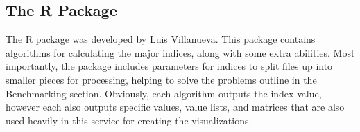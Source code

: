 \subsection{The  R Package}
The  R package was developed by Luis Villanueva. This package contains algorithms for calculating the major indices, along with some extra abilities. Most importantly, the  package includes parameters for indices to split files up into smaller pieces for processing, helping to solve the problems outline in the Benchmarking section. Obviously, each algorithm outputs the index value, however each also outputs specific values, value lists, and matrices that are also used heavily in this service for creating the visualizations.







